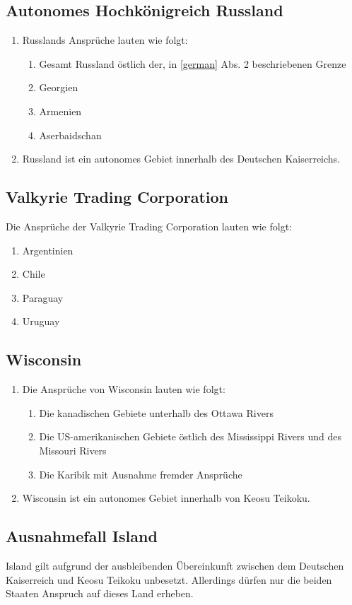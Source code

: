 \documentclass{article}
\begin{document}
\subsection{Autonomes Hochkönigreich Russland}
\begin{enumerate}[(1)]
    \item Russlands Ansprüche lauten wie folgt:
    \begin{enumerate}[1.]
        \item Gesamt Russland östlich der, in \ref{german} Abs. 2 beschriebenen Grenze
        \item Georgien
        \item Armenien
        \item Aserbaidschan
    \end{enumerate}
    \item Russland ist ein autonomes Gebiet innerhalb des Deutschen Kaiserreichs.
\end{enumerate}

\subsection{Valkyrie Trading Corporation}
Die Ansprüche der Valkyrie Trading Corporation lauten wie folgt:
\begin{enumerate}
    \item Argentinien
    \item Chile
    \item Paraguay
    \item Uruguay
\end{enumerate}

\subsection{Wisconsin}
\begin{enumerate}[(1)]
    \item Die Ansprüche von Wisconsin lauten wie folgt:
    \begin{enumerate}[1.]
        \item Die kanadischen Gebiete unterhalb des Ottawa Rivers
        \item Die US-amerikanischen Gebiete östlich des Mississippi Rivers und des Missouri Rivers
        \item Die Karibik mit Ausnahme fremder Ansprüche
    \end{enumerate}
    \item Wisconsin ist ein autonomes Gebiet innerhalb von Keosu Teikoku.
\end{enumerate}

\subsection{Ausnahmefall Island}
Island gilt aufgrund der ausbleibenden Übereinkunft zwischen dem Deutschen Kaiserreich und Keosu Teikoku unbesetzt. Allerdings dürfen nur die beiden
Staaten Anspruch auf dieses Land erheben.
\end{document}
